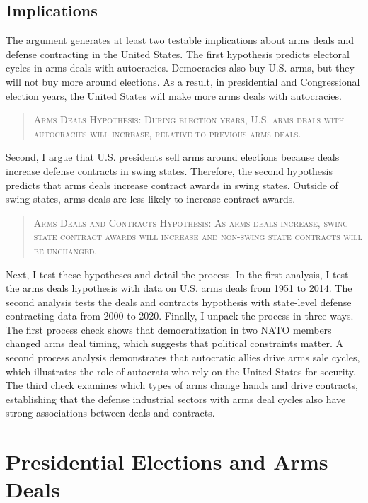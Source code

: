 \documentclass[12pt]{article}
\begin{document}
\subsection{Implications}


The argument generates at least two testable implications about arms deals and defense contracting in the United States. 
The first hypothesis predicts electoral cycles in arms deals with autocracies.
Democracies also buy U.S. arms, but they will not buy more around elections. 
As a result, in presidential and Congressional election years, the United States will make more arms deals with autocracies. 


\begin{quote}
\textsc{Arms Deals Hypothesis: During election years, U.S. arms deals with autocracies will increase, relative to previous arms deals.}
\end{quote}


Second, I argue that U.S. presidents sell arms around elections because deals increase defense contracts in swing states.
Therefore, the second hypothesis predicts that arms deals increase contract awards in swing states.
Outside of swing states, arms deals are less likely to increase contract awards. 


\begin{quote}
\textsc{Arms Deals and Contracts Hypothesis: As arms deals increase, swing state contract awards will increase and non-swing state contracts will be unchanged.}
\end{quote}


Next, I test these hypotheses and detail the process. 
In the first analysis, I test the arms deals hypothesis with data on U.S. arms deals from 1951 to 2014.  
The second analysis tests the deals and contracts hypothesis with state-level defense contracting data from 2000 to 2020. 
Finally, I unpack the process in three ways.
The first process check shows that democratization in two NATO members changed arms deal timing, which suggests that political constraints matter. 
A second process analysis demonstrates that autocratic allies drive arms sale cycles, which illustrates the role of autocrats who rely on the United States for security. 
The third check examines which types of arms change hands and drive contracts, establishing that the defense industrial sectors with arms deal cycles also have strong associations between deals and contracts. 


\section{Presidential Elections and Arms Deals}
\end{document}
